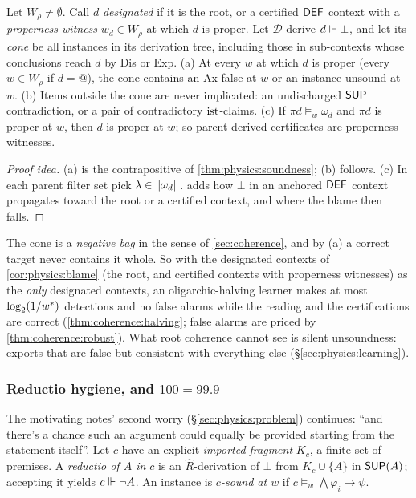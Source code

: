 \begin{corollary}\label{cor:physics:blame}
Let $W_\rho\neq\emptyset$. Call $d$ \emph{designated} if it is the root, or a certified $\mathsf{DEF}$
context with a \emph{properness witness} $w_d\in W_\rho$ at which $d$ is proper. Let $\mathcal D$
derive $d\Vdash\bot$, and let its \emph{cone} be all instances in its derivation tree,
including those in sub-contexts whose conclusions reach $d$ by Dis or Exp. (a) At every
$w$ at which $d$ is proper (every $w\in W_\rho$ if $d=@$), the cone contains an Ax false
at $w$ or an instance unsound at $w$. (b) Items outside the cone are never implicated: an
undischarged $\mathsf{SUP}$ contradiction, or a pair of contradictory $\mathrm{ist}$-claims. (c) If
$\pi d\models_w\omega_d$ and $\pi d$ is proper at $w$, then $d$ is proper at $w$; so
parent-derived certificates are properness witnesses.
\end{corollary}
\begin{proof}[Proof idea]
(a) is the contrapositive of \cref{thm:physics:soundness}; (b) follows. (c) In each parent
filter set pick $\lambda\in\lVert \omega_d\rVert$.  adds how $\bot$ in an anchored $\mathsf{DEF}$ context
propagates toward the root or a certified context, and where the blame then falls.
\end{proof}

The cone is a \emph{negative bag} in the sense of \cref{sec:coherence}, and by (a) a
correct target never contains it whole. So with the designated contexts of
\cref{cor:physics:blame} (the root, and certified contexts with properness witnesses) as
the \emph{only} designated contexts, an oligarchic-halving learner makes at most
$\log_2(1/w^{*})$ detections and no false alarms while the reading and the certifications
are correct (\cref{thm:coherence:halving}; false alarms are priced by
\cref{thm:coherence:robust}). What root coherence cannot see is silent unsoundness:
exports that are false but consistent with everything else (\S\ref{sec:physics:learning}).

\subsubsection{Reductio hygiene, and $100=99.9$}

The motivating notes' second worry (\S\ref{sec:physics:problem}) continues: ``and there's a
chance such an argument could equally be provided starting from the statement itself''.
Let $c$ have an explicit \emph{imported fragment} $K_c$, a finite set of premises. A
\emph{reductio of $A$ in $c$} is an $\hat R$-derivation of $\bot$ from $K_c\cup\{A\}$ in
$\mathsf{SUP}(A)$; accepting it yields $c\Vdash\neg A$. An instance is \emph{$c$-sound at $w$} if
$c\models_w\bigwedge\varphi_i\to\psi$.

